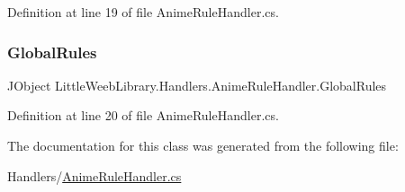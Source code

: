 Definition at line 19 of file Anime\+Rule\+Handler.\+cs.

\mbox{\label{class_little_weeb_library_1_1_handlers_1_1_anime_rule_handler_aff5df38f10696987486267a30095ad49}} 
\subsubsection{\texorpdfstring{Global\+Rules}{GlobalRules}}
{\footnotesize\ttfamily J\+Object Little\+Weeb\+Library.\+Handlers.\+Anime\+Rule\+Handler.\+Global\+Rules\hspace{0.3cm}{\ttfamily [private]}}



Definition at line 20 of file Anime\+Rule\+Handler.\+cs.



The documentation for this class was generated from the following file\+:\begin{DoxyCompactItemize}
\item 
Handlers/\mbox{\hyperlink{_anime_rule_handler_8cs}{Anime\+Rule\+Handler.\+cs}}\end{DoxyCompactItemize}
